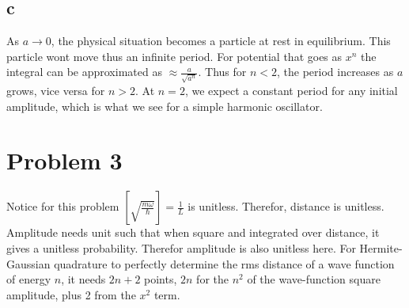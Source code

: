 \documentclass{article}
\begin{document}
\subsection{c}
As $a\rightarrow 0$, the physical situation becomes a particle at rest in equilibrium. This particle wont move thus an infinite period. For potential that goes as $x^n$ the integral can be approximated as $\approx \frac{a}{\sqrt{a^n}}$. Thus for $n<2$, the period increases as $a$ grows, vice versa for $n>2$. At $n=2$, we expect a constant period for any initial amplitude, which is what we see for a simple harmonic oscillator.
\section{Problem 3}
  
Notice for this problem $\left [\sqrt{\frac{m\omega}{\hbar}}   \right] = \frac{1}{L}$ is unitless. Therefor, distance is unitless. Amplitude needs unit such that when square and integrated over distance, it gives a unitless probability. Therefor amplitude is also unitless here.
For Hermite-Gaussian quadrature to perfectly determine the rms distance of a wave function of energy $n$, it needs $2n+2$ points, $2n$ for the $n^2$ of the wave-function square amplitude, plus 2 from the $x^2$ term.
\end{document}
